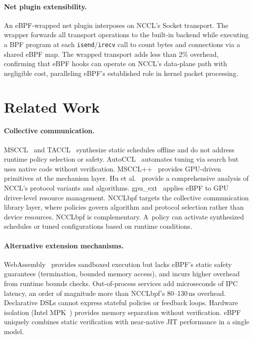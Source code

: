\documentclass[sigplan,10pt]{acmart}
\newcommand{\sysname}{NCCLbpf\xspace}
\newcommand{\ns}{\,ns\xspace}
\begin{document}
\paragraph{Net plugin extensibility.}
An eBPF-wrapped net plugin interposes on
NCCL's Socket transport. The wrapper forwards all transport
operations to the built-in backend while executing a BPF program
at each \texttt{isend}/\texttt{irecv} call to count bytes and
connections via a shared eBPF map. The wrapped transport adds
less than 2\% overhead, confirming that eBPF hooks can operate
on NCCL's data-plane path with negligible cost, paralleling eBPF's
established role in kernel packet processing.

\section{Related Work}
\label{sec:related}

\paragraph{Collective communication.}
MSCCL~\cite{msccl} and TACCL~\cite{taccl} synthesize static
schedules offline and do not address runtime policy selection
or safety. AutoCCL~\cite{autoccl} automates tuning via search
but uses native code without verification.
MSCCL++~\cite{mscclpp} provides GPU-driven primitives at the
mechanism layer. Hu et al.~\cite{demystifying-nccl} provide a
comprehensive analysis of NCCL's protocol variants and algorithms.
gpu\_ext~\cite{gpu-ext} applies eBPF to GPU driver-level resource
management. \sysname targets the collective communication library
layer, where policies govern algorithm and protocol selection
rather than device resources. \sysname is complementary. A~policy
can activate synthesized schedules or tuned configurations based
on runtime conditions.

\paragraph{Alternative extension mechanisms.}
WebAssembly~\cite{wasm} provides sandboxed execution but
lacks eBPF's static safety guarantees (termination, bounded
memory access), and incurs higher overhead from runtime bounds
checks. Out-of-process services add microseconds of IPC
latency, an order of magnitude more than \sysname's
80--130\ns overhead. Declarative DSLs cannot express stateful
policies or feedback loops. Hardware isolation
(Intel MPK~\cite{erim}) provides memory separation without
verification. eBPF uniquely combines static verification with
near-native JIT performance in a single model.
\end{document}
